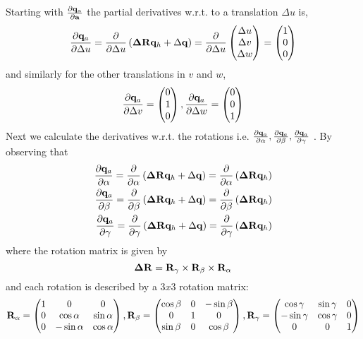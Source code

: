 \documentclass{article}
\def\vec#1{\ensuremath{\mathrm{\bf #1}}}
\def\partder#1#2{\ensuremath{\frac{\partial #1}{\partial #2}}}
\begin{document}
Starting with $\partder{\vec{q}_a}{\vec{a}}$ the partial derivatives w.r.t. to a translation $\Delta u$ is,
\[
\partder{\vec{q}_a}{\Delta u}  =
\partder{}{\Delta u} \left ( \vec{\Delta R}\vec{q}_h + \Delta \vec{q}  \right ) = 
\partder{}{\Delta u} 
\begin{pmatrix}
\Delta u \\
\Delta v \\
\Delta w
\end{pmatrix}
=
\begin{pmatrix}
1 \\
0 \\
0
\end{pmatrix}
\]
 and similarly for the other translations in $v$ and $w$,
 \[
 \partder{\vec{q}_a}{\Delta v} =
\begin{pmatrix}
0 \\
1 \\
0
\end{pmatrix}
, \partder{\vec{q}_a}{\Delta w} =
\begin{pmatrix}
0 \\
0 \\
1
\end{pmatrix} 
\]
Next we calculate the derivatives w.r.t. the rotations i.e. $\partder{\vec{q}_a}{\alpha},\partder{\vec{q}_a}{\beta},\partder{\vec{q}_a}{\gamma}$ . By observing that
\begin{eqnarray}
\partder{\vec{q}_a}{\alpha} = \partder{}{\alpha} \left(  \vec{\Delta R}\vec{q}_h + \Delta \vec{q} \right) =  \partder{}{\alpha} \left(  \vec{\Delta R}\vec{q}_h \right) \\
\partder{\vec{q}_a}{\beta} = \partder{}{\beta} \left(  \vec{\Delta R}\vec{q}_h + \Delta \vec{q} \right) =  \partder{}{\beta} \left(  \vec{\Delta R}\vec{q}_h \right) \\
\partder{\vec{q}_a}{\gamma} = \partder{}{\gamma} \left(  \vec{\Delta R}\vec{q}_h + \Delta \vec{q} \right) =  \partder{}{\gamma} \left(  \vec{\Delta R}\vec{q}_h \right)
\end{eqnarray}
where the rotation matrix is given by  
\begin{equation}
\vec{\Delta R} = \vec{R}_\gamma \times \vec{R}_\beta \times  \vec{R}_\alpha \nonumber
\end{equation}
and each rotation is described by a $3x3$ rotation matrix:
\[
 \vec{R}_\alpha = 
\begin{pmatrix}
 1 & 0 & 0 \\
 0 & \cos \alpha & \sin \alpha \\
 0 & -\sin \alpha & \cos \alpha
 \end{pmatrix}
 ,  \vec{R}_\beta = 
\begin{pmatrix}
 \cos \beta & 0 & -\sin \beta \\
 0 & 1 & 0 \\
 \sin \beta & 0 & \cos \beta
 \end{pmatrix}
 ,  \vec{R}_\gamma = 
\begin{pmatrix}
\cos \gamma & \sin \gamma & 0 \\
-\sin \gamma & \cos \gamma & 0 \\
0 & 0 & 1
 \end{pmatrix}
\]
\end{document}
